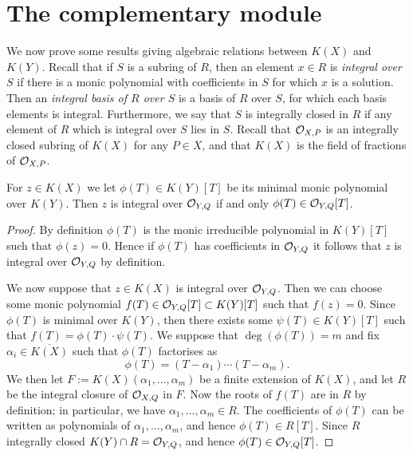 \section{The complementary module}


We now prove some results giving algebraic relations between $K(X)$ and $K(Y)$.
Recall that if $S$ is a subring of $R$, then an element $x\in R$ is {\em integral over $S$} if there is a monic polynomial with coefficients in $S$ for which $x$ is a solution.
Then an {\em integral basis of $R$ over $S$} is a basis of $R$ over $S$, for which each basis elements is integral.
Furthermore, we say that $S$ is integrally closed in $R$ if any element of $R$ which is integral over $S$ lies in $S$.
Recall that ${\cal O}_{X,P}$ is an integrally closed subring of $K(X)$ for any $P\in X$, and that $K(X)$ is the field of fractions of ${\cal O}_{X,P}$.


    \begin{prop}
    For $z\in K(X)$ we let $\phi(T)\in K(Y)[T]$ be its minimal monic polynomial over $K(Y)$.
    Then $z$ is integral over ${\cal O}_{Y,Q}$ if and only $\phi (T)\in {\cal O}_{Y,Q}[T]$.
    \end{prop}
    \begin{proof}
    By definition $\phi(T)$ is the monic irreducible polynomial in $K(Y)[T]$ such that $\phi(z) = 0$. 
    Hence if $\phi (T)$ has coefficients in ${\cal O}_{Y,Q}$ it follows that $z$ is integral over ${\cal O}_{Y,Q}$ by definition.
    
    We now suppose that $z\in K(X)$ is integral over ${\cal O}_{Y,Q}$.
    Then we can choose some monic polynomial $f(T)\in {\cal O}_{Y,Q}[T] \subset K(Y)[T]$ such that $f(z) = 0$.
    Since $\phi(T)$ is minimal over $K(Y)$, then there exists some $\psi(T)\in K(Y)[T]$ such that $ f(T) = \phi(T)\cdot \psi(T)$.
    We suppose that $\deg(\phi(T)) = m$ and fix $\alpha_i \in \overline{K(X)}$ such that $\phi(T)$ factorises as 
        \[  
        \phi(T) = (T-\alpha_1)\cdots (T-\alpha_m).
        \]
    We then let $F := K(X)(\alpha_1, \ldots, \alpha_m)$ be a finite extension of $K(X)$, and let $R$ be the integral closure of ${\cal O}_{X,Q}$ in $F$.
    Now the roots of $f(T)$ are in $R$ by definition; in particular, we have $\alpha_1, \ldots, \alpha_m \in R$.
    The coefficients of $\phi(T)$ can be written as polynomials of $\alpha_1, \ldots, \alpha_m$, and hence $\phi(T) \in R[T]$.
    Since $R$ integrally closed $K(Y)\cap R = {\cal O}_{Y,Q}$, and hence $\phi(T)\in {\cal O}_{Y,Q}[T]$.
    \end{proof}

